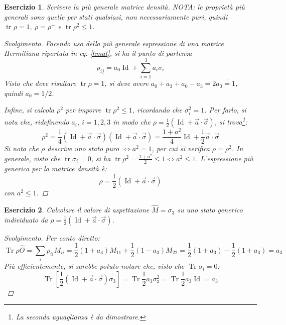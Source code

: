 \documentclass[11pt, a4paper]{scrartcl} %
\numberwithin{equation}{subsection}
\theoremstyle{style2}
\theoremstyle{style1}
\newtheorem{esercizio}{Esercizio}[section]
\renewcommand\qedsymbol{$\blacksquare$}
\newenvironment{svolgimento}{\renewcommand\qedsymbol{$\spadesuit$}\begin{proof}[Svolgimento]}{\end{proof}}
\begin{document}
\begin{esercizio}
	Scrivere la pi\`u generale matrice densit\`a. NOTA: le propriet\`a pi\`u generali sono quelle per stati qualsiasi, non necessariamente puri, quindi $\operatorname{tr} \rho = 1, \ \rho  = \rho ^+$ e $\operatorname{tr} \rho ^2 \le 1$.
	\begin{svolgimento}
		Facendo uso della pi\`u generale espressione di una matrice Hermitiana riportata in eq. \ref{hmat}, si ha il punto di partenza
		\[
		\rho _{ij} = a_0 \operatorname{Id} + \sum_{i=1}^{3} a_i \sigma _i
		\] 
		Visto che deve risultare $\operatorname{tr} \rho  = 1$, si deve avere $a_0 + a_3 + a_0 - a_3 = 2a_0\stackrel{!}{=} 1$, quindi $a_0= 1 / 2$.

		Infine, si calcola $\rho ^2$ per imporre $\operatorname{tr} \rho ^2 \le 1$, ricordando che $\sigma _i ^2 = 1$. 
		Per farlo, si nota che, ridefinendo $a_i, \ i=1,2,3$ in modo che $\rho  = \frac{1}{2}\left(\operatorname{Id} +\vec{a}\cdot \vec{\sigma }\right) $, si trova\footnote{La seconda uguaglianza \`e da dimostrare.}:
		\[
		\rho ^2 = \frac{1}{4} ( \operatorname{Id}  + \vec{a}\cdot \vec{\sigma }) ( \operatorname{Id} + \vec{a}\cdot \vec{\sigma }) = \frac{1+a^2}{4}\operatorname{Id} + \frac{1}{2}\vec{a}\cdot \vec{\sigma }
		\] 
		Si nota che $\rho $ descrive uno stato puro $\iff a^2 = 1$, per cui si verifica $\rho  = \rho ^2$. 
		In generale, visto che $\operatorname{tr} \sigma _i =0$, si ha $\operatorname{tr} \rho ^2 = \frac{1+a^2}{2} \le 1 \iff a^2 \le 1$.
		L'espressione pi\`u generica per la matrice densit\`a \`e:
		\[
		\rho = \frac{1}{2}(\operatorname{Id} + \vec{a}\cdot \vec{\sigma })
		\] 
		con $a^2 \le 1$. 
	\end{svolgimento}
\end{esercizio}
\begin{esercizio}
	Calcolare il valore di aspettazione $\hat{M}= \sigma _3$ su uno stato generico individuato da $\rho = \frac{1}{2}\left(\operatorname{Id} +\vec{a}\cdot \vec{\sigma }\right) $.
	\begin{svolgimento}
		Per conto diretto:
		\[
			\operatorname{Tr} \rho \hat{O} = \sum_{i}^{} \rho _{ii} M_{ii} = \frac{1}{2}\left(1+a_3\right)  M_{11} + \frac{1}{2}\left(1- a_3\right)  M_{22}= \frac{1}{2}(1+a_3) -\frac{1}{2}(1+a_3) = a_3 
		\] 
		Pi\`u efficientemente, si sarebbe potuto notare che, visto che $\operatorname{Tr} \sigma _i = 0$:
		\[
		\operatorname{Tr} \left[ \frac{1}{2}\left(\operatorname{Id}  + \vec{a}\cdot \vec{\sigma }\right) \sigma _3 \right] = \operatorname{Tr} \frac{1}{2} a_3 \sigma ^2_3 = \operatorname{Tr} \frac{1}{2}a_3 \operatorname{Id} = a_3
		\] 
	\end{svolgimento}
\end{esercizio}
\end{document}
